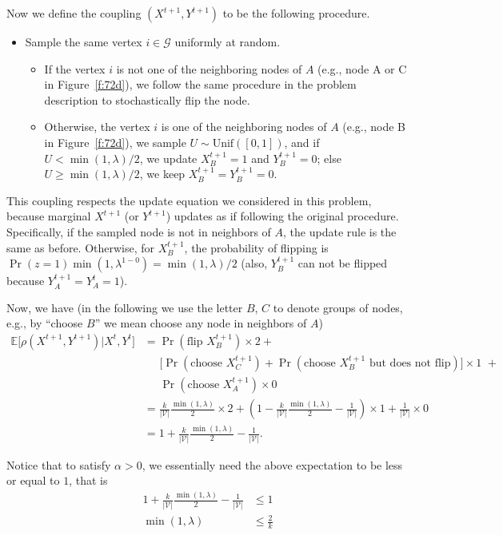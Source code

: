 \documentclass{article}
\begin{document}
Now we define the coupling $(X^{t+1}, Y^{t+1})$ to be the following procedure.
\begin{itemize}
	\item Sample the same vertex $i \in \mathscr{G}$ uniformly at random. 
	\begin{itemize}
		\item If the vertex $i$ is not one of the neighboring nodes of $A$
(e.g., node A or C in Figure~\ref{f:72d}),
we follow the same procedure in the problem description to stochastically flip the node.
		\item Otherwise, the vertex $i$ is one of the neighboring nodes of $A$
(e.g., node B in Figure~\ref{f:72d}), we sample $U \sim \text{Unif}([0, 1])$,
and if $U < \min(1, \lambda) / 2$, we update $X^{t+1}_B = 1$ and $Y^{t+1}_B = 0$;
else $U \geq \min(1, \lambda) / 2$, we keep $X^{t+1}_B = Y^{t+1}_B = 0$.
	\end{itemize}
\end{itemize}
%

This coupling respects the update equation we considered in this problem,
because marginal $X^{t+1}$ (or $Y^{t+1}$) updates as if following the original procedure.
Specifically, if the sampled node is not in neighbors of $A$, the update rule is the
same as before. Otherwise, for $X^{t+1}_B$, the probability of flipping is $\Pr(z=1)\min(1, \lambda^{1-0}) = \min(1, \lambda) / 2$ (also, $Y^{t+1}_B$ can not be flipped because $Y^{t+1}_A=Y^{t}_A=1$).

Now, we have (in the following we use the letter $B$, $C$ to denote groups of nodes, e.g., by ``choose $B$'' we mean choose any node in neighbors of $A$)
\begin{align*}
	\mathbb{E}\big[\rho(X^{t+1}, Y^{t+1}) | X^t, Y^t \big] &= \Pr(\text{flip $X^{t+1}_B$}) \times 2 + \\
	&\;\;\;\;\; \big[\Pr(\text{choose $X^{t+1}_C$}) + \Pr(\text{choose $X^{t+1}_B$ but does not flip})\big] \times 1 \,\, + \\
	&\;\;\;\;\; \Pr(\text{choose $X^{t+1}_A$}) \times 0 \\
	&= \frac{k}{|\mathscr{V}|}\frac{\min(1, \lambda)}{2} \times 2 + (1 - \frac{k}{|\mathscr{V}|}\frac{\min(1, \lambda)}{2} - \frac{1}{|\mathscr{V}|}) \times 1 + \frac{1}{|\mathscr{V}|} \times 0 \\
	& = 1 + \frac{k}{|\mathscr{V}|}\frac{\min(1, \lambda)}{2} - \frac{1}{|\mathscr{V}|}.
\end{align*}

Notice that to satisfy $\alpha > 0$, we essentially need the above expectation to be less or equal to $1$, that is
\begin{align*}
	1 + \frac{k}{|\mathscr{V}|}\frac{\min(1, \lambda)}{2} - \frac{1}{|\mathscr{V}|} &\leq 1 \\
	\min(1, \lambda) &\leq \frac{2}{k}
\end{align*}
\end{document}
